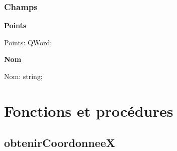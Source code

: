 \documentclass{report}
\newif\ifpdf
\begin{document}
\subsubsection*{\large{\textbf{Champs}}\normalsize\hspace{1ex}\hfill}
\begin{list}{}{
\setlength{\itemindent}{0cm}
\setlength{\listparindent}{0cm}
\setlength{\leftmargin}{\evensidemargin}
\addtolength{\leftmargin}{\tmplength}
\settowidth{\labelsep}{X}
\addtolength{\leftmargin}{\labelsep}
\setlength{\labelwidth}{\tmplength}
}
\label{Types.Score-Points}
\item[\textbf{Points}\hfill]
\ifpdf
\begin{flushleft}
\fi
\begin{ttfamily}
Points: QWord;\end{ttfamily}

\ifpdf
\end{flushleft}
\fi


\par  \label{Types.Score-Nom}
\item[\textbf{Nom}\hfill]
\ifpdf
\begin{flushleft}
\fi
\begin{ttfamily}
Nom: string;\end{ttfamily}

\ifpdf
\end{flushleft}
\fi


\par  \end{list}
\section{Fonctions et procédures}
\ifpdf
\subsection*{\large{\textbf{obtenirCoordonneeX}}\normalsize\hspace{1ex}\hrulefill}
\else
\end{document}
